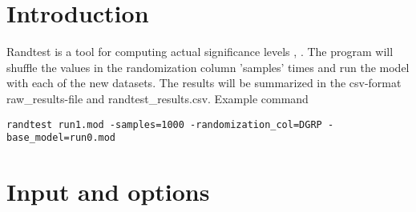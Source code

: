 



\maketitle
\newcommand{\guidetoolname}{randtest}


\section{Introduction}

Randtest is a tool for computing actual significance levels \cite{Wahlby}, \cite{Deng}. 
The program will shuffle the values in the randomization 
column 'samples' times and run the model with each of the new datasets. The results will be summarized in the csv-format 
raw\_results-file and randtest\_results.csv.
Example command
\begin{verbatim}
randtest run1.mod -samples=1000 -randomization_col=DGRP -base_model=run0.mod
\end{verbatim}

\section{Input and options}
